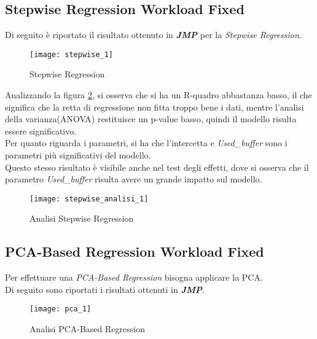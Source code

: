 \clearpage

\subsection{Stepwise Regression Workload Fixed}

Di seguito è riportato il risultato ottenuto in \textbf{\textit{JMP}} per
la \textit{Stepwise Regression}.\\

\begin{figure}[!htbp]
  \centering
  \texttt{[image: stepwise\_1]}
  \caption{Stepwise Regression}
  \label{and_stepwise_1}
\end{figure}
\clearpage
Analizzando la figura \ref{and_stepwise_analisi_1}, si osserva che si ha un R-quadro
abbastanza basso, il che significa che la retta di regressione non fitta troppo
bene i dati, mentre l'analisi della varianza(ANOVA) restituisce un p-value basso,
quindi il modello risulta essere significativo.\\
Per quanto riguarda i parametri, si ha che l'intercetta e \textit{Used\_buffer}
sono i parametri più significativi del modello.\\
Questo stesso risultato è visibile anche nel test degli effetti, dove si osserva
che il parametro \textit{Used\_buffer} risulta avere un grande impatto sul modello.\\
\begin{figure}[!htbp]
  \centering
  \texttt{[image: stepwise\_analisi\_1]}
  \caption{Analisi Stepwise Regression}
  \label{and_stepwise_analisi_1}
\end{figure}

\clearpage

\subsection{PCA-Based Regression Workload Fixed}

Per effettuare una \textit{PCA-Based Regression} bisogna applicare la PCA.\\
Di seguito sono riportati i risultati ottenuti in \textbf{\textit{JMP}}.\\

\begin{figure}[!htbp]
  \centering
  \texttt{[image: pca\_1]}
  \caption{Analisi PCA-Based Regression}
  \label{and_pca_1}
\end{figure}

